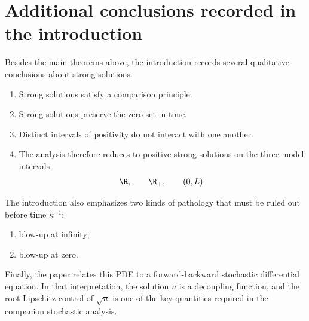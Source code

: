 \section{Additional conclusions recorded in the introduction}

Besides the main theorems above, the introduction records several qualitative conclusions about strong solutions.

\begin{enumerate}[leftmargin=2em]
    \item Strong solutions satisfy a comparison principle.
    \item Strong solutions preserve the zero set in time.
    \item Distinct intervals of positivity do not interact with one another.
    \item The analysis therefore reduces to positive strong solutions on the three model intervals
    \[
        \R, \qquad \R_+, \qquad (0,L).
    \]
\end{enumerate}

The introduction also emphasizes two kinds of pathology that must be ruled out before time $\kappa^{-1}$:
\begin{enumerate}[leftmargin=2em]
    \item blow-up at infinity;
    \item blow-up at zero.
\end{enumerate}

Finally, the paper relates this PDE to a forward-backward stochastic differential equation. In that interpretation, the solution $u$ is a decoupling function, and the root-Lipschitz control of $\sqrt{u}$ is one of the key quantities required in the companion stochastic analysis.
